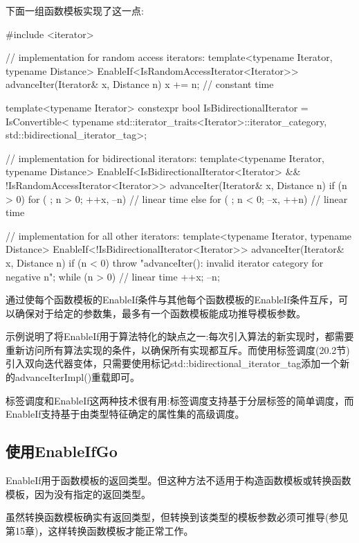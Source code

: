 下面一组函数模板实现了这一点:

\begin{cpp}
#include <iterator>

// implementation for random access iterators:
template<typename Iterator, typename Distance>
EnableIf<IsRandomAccessIterator<Iterator>>
advanceIter(Iterator& x, Distance n) {
	x += n; // constant time
}

template<typename Iterator>
constexpr bool IsBidirectionalIterator =
	IsConvertible<
		typename std::iterator_traits<Iterator>::iterator_category,
		std::bidirectional_iterator_tag>;

// implementation for bidirectional iterators:
template<typename Iterator, typename Distance>
EnableIf<IsBidirectionalIterator<Iterator> &&
		!IsRandomAccessIterator<Iterator>>
advanceIter(Iterator& x, Distance n) {
	if (n > 0) {
		for ( ; n > 0; ++x, --n) { // linear time
		}
	} else {
		for ( ; n < 0; --x, ++n) { // linear time
		}
	}
}

// implementation for all other iterators:
template<typename Iterator, typename Distance>
EnableIf<!IsBidirectionalIterator<Iterator>>
advanceIter(Iterator& x, Distance n) {
	if (n < 0) {
		throw "advanceIter(): invalid iterator category for negative n";
	}
	while (n > 0) { // linear time
		++x;
		--n;
	}
}
\end{cpp}

通过使每个函数模板的EnableIf条件与其他每个函数模板的EnableIf条件互斥，可以确保对于给定的参数集，最多有一个函数模板能成功推导模板参数。

示例说明了将EnableIf用于算法特化的缺点之一:每次引入算法的新实现时，都需要重新访问所有算法实现的条件，以确保所有实现都互斥。而使用标签调度(20.2节)引入双向迭代器变体，只需要使用标记std::bidirectional\_iterator\_tag添加一个新的advanceIterImpl()重载即可。

标签调度和EnableIf这两种技术很有用:标签调度支持基于分层标签的简单调度，而EnableIf支持基于由类型特征确定的属性集的高级调度。

\subsection{使用EnableIfGo}

EnableIf用于函数模板的返回类型。但这种方法不适用于构造函数模板或转换函数模板，因为没有指定的返回类型。

\begin{notice}
虽然转换函数模板确实有返回类型，但转换到该类型的模板参数必须可推导(参见第15章)，这样转换函数模板才能正常工作。
\end{notice}

